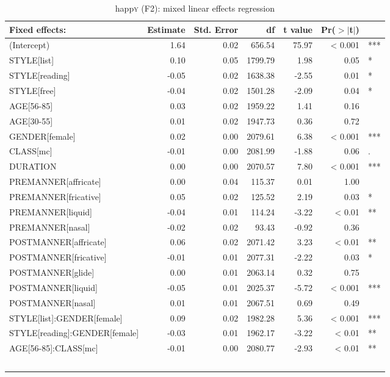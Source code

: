 {
	\footnotesize
	\begin{longtable}[c]{p{}rrrrrl}
		\caption{happ\textsc{y} (F2): mixed linear effects regression}\label{tab.regression.happy.f2}\\

		\hline
		Fixed effects: & Estimate & Std. Error & df & t value & Pr($>$$|$t$|$) & \\ 
		\hline
		(Intercept) & 1.64 & 0.02 & 656.54 & 75.97 & < 0.001 & *** \\ 
		STYLE[list] & 0.10 & 0.05 & 1799.79 & 1.98 & 0.05 & *\\ 
		STYLE[reading] & -0.05 & 0.02 & 1638.38 & -2.55 & 0.01 & *\\ 
		STYLE[free] & -0.04 & 0.02 & 1501.28 & -2.09 & 0.04 & *\\ 
		AGE[56-85] & 0.03 & 0.02 & 1959.22 & 1.41 & 0.16 & \\ 
		AGE[30-55] & 0.01 & 0.02 & 1947.73 & 0.36 & 0.72 & \\ 
		GENDER[female] & 0.02 & 0.00 & 2079.61 & 6.38 & < 0.001 & *** \\ 
		CLASS[mc] & -0.01 & 0.00 & 2081.99 & -1.88 & 0.06 & .\\ 
		DURATION & 0.00 & 0.00 & 2070.57 & 7.80 & < 0.001 & *** \\ 
		PREMANNER[affricate] & 0.00 & 0.04 & 115.37 & 0.01 & 1.00 & \\ 
		PREMANNER[fricative] & 0.05 & 0.02 & 125.52 & 2.19 & 0.03 & *\\ 
		PREMANNER[liquid] & -0.04 & 0.01 & 114.24 & -3.22 & < 0.01 & ** \\ 
		PREMANNER[nasal] & -0.02 & 0.02 & 93.43 & -0.92 & 0.36 & \\ 
		POSTMANNER[affricate] & 0.06 & 0.02 & 2071.42 & 3.23 & < 0.01 & ** \\ 
		POSTMANNER[fricative] & -0.01 & 0.01 & 2077.31 & -2.22 & 0.03 & * \\ 
		POSTMANNER[glide] & 0.00 & 0.01 & 2063.14 & 0.32 & 0.75 & \\ 
		POSTMANNER[liquid] & -0.05 & 0.01 & 2025.37 & -5.72 & < 0.001 & *** \\ 
		POSTMANNER[nasal] & 0.01 & 0.01 & 2067.51 & 0.69 & 0.49 & \\ 
		STYLE[list]:GENDER[female] & 0.09 & 0.02 & 1982.28 & 5.36 & < 0.001 & *** \\ 
		STYLE[reading]:GENDER[female] & -0.03 & 0.01 & 1962.17 & -3.22 & < 0.01 & ** \\ 
		AGE[56-85]:CLASS[mc] & -0.01 & 0.00 & 2080.77 & -2.93 & < 0.01 & ** \\ 
$$
\end{longtable}}
